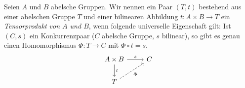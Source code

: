 \begin{defn}
  Seien $A$ und $B$ abelsche Gruppen.
  Wir nennen ein Paar $(T,t)$ bestehend aus einer abelschen Gruppe $T$ und einer bilinearen Abbildung $t \colon A \times B \to T$ ein \emph{Tensorprodukt von $A$ und $B$}, wenn folgende universelle Eigenschaft gilt:
  Ist $(C,s)$ ein Konkurrenzpaar ($C$ abelsche Gruppe, $s$ bilinear), so gibt es genau einen Homomorphismus $\Phi \colon T \to C$ mit $\Phi \circ t = s$.
  \begin{equation*}
    \begin{tikzcd}
      A\times B \arrow{r}{s}
          \arrow{d}{t}
      & C\\
      T \arrow[dashed,swap]{ur}{\Phi}
    \end{tikzcd}
  \end{equation*}
\end{defn}

